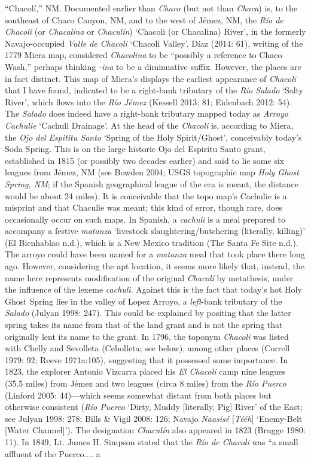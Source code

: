 “Chacolí,” NM.  Documented earlier than \textit{Chaco} (but not than \textit{Chaca}) is, to the southeast of Chaco Canyon, NM, and to the west of Jémez, NM, the \textit{Río de Chacoli} (or \textit{Chacalina} or \textit{Chaculín}) ‘Chacoli (or Chacalina) River’, in the formerly Navajo-occupied \textit{Valle de Chacoli} ‘Chacoli Valley’.  Díaz (2014: 61), writing of the 1779 Miera map, considered \textit{Chacolina} to be “possibly a reference to Chaco Wash,” perhaps thinking \textit{{}-ina} to be a diminuative suffix.  However, the places are in fact distinct.  This map of Miera’s displays the earliest appearance of \textit{Chacoli} that I have found, indicated to be a right-bank tributary of the \textit{Río Salado} ‘Salty River’, which flows into the \textit{Río Jémez} (Kessell 2013: 81; Eidenbach 2012: 54).  The \textit{Salado }does indeed have a right-bank tributary mapped today as \textit{Arroyo Cachulie }‘Cachuli Drainage’.  At the head of the \textit{Chacoli} is, according to Miera, the \textit{Ojo del Espititu Santo} ‘Spring of the Holy Spirit/Ghost’, conceivably today’s Soda Spring.  This is on the large historic Ojo del Espiritu Santo grant, established in 1815 (or possibly two decades earlier) and said to lie some six leagues from Jémez, NM (see Bowden 2004; USGS topographic map \textit{Holy Ghost Spring, NM}; if the Spanish geographical league of the era is meant, the distance would be about 24 miles).  It is conceivable that the topo map’s Cachulie is a misprint and that Chaculie was meant; this kind of error, though rare, does occasionally occur on such maps.  In Spanish, a \textit{cachuli} is a meal prepared to accompany a festive \textit{matanza} ‘livestock slaughtering/butchering (literally, killing)’ (El Bienhablao n.d.), which is a New Mexico tradition (The Santa Fe Site n.d.).  The arroyo could have been named for a \textit{matanza} meal that took place there long ago.  However, considering the apt location, it seems more likely that, instead, the name here represents modification of the original \textit{Chacolí} by metathesis, under the influence of the lexeme \textit{cachuli}.  Against this is the fact that today’s hot Holy Ghost Spring lies in the valley of Lopez Arroyo, a \textit{left}{}-bank tributary of the \textit{Salado} (Julyan 1998: 247).  This could be explained by positing that the latter spring takes its name from that of the land grant and is not the spring that originally lent its name to the grant.  In 1796, the toponym \textit{Chacoli }was listed with Chelly and Sevolleta (Cebolleta; see below), among other places (Correll 1979: 92; Reeve 1971a:105), suggesting that it possessed some importance.  In 1823, the explorer Antonio Vizcarra placed his \textit{El Chacoli} camp nine leagues (35.5 miles) from Jémez and two leagues (circa 8 miles) from the \textit{Río Puerco} (Linford 2005: 44)—which seems somewhat distant from both places but otherwise consistent (\textit{Río Puerco} ‘Dirty, Muddy [literally, Pig] River’ of the East; see Julyan 1998: 278; Bills \& Vigil 2008: 126; Navajo \textit{Naasisé }[\textit{Tééh}] ‘Enemy-Belt [Water Channel]’).  The designation\textit{ Chaculín }also appeared in\textit{ }1823 (Brugge 1980: 11).  In 1849, Lt. James H. Simpson stated that the \textit{Río de Chacoli} was “a small affluent of the Puerco.... a 